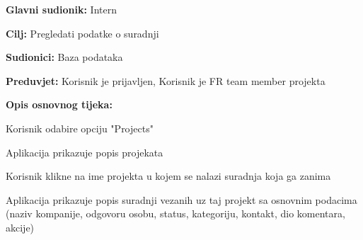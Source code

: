 					\noindent {}
					\begin{packed_item}
					
						\item \textbf{Glavni sudionik:} Intern
						\item \textbf{Cilj:} Pregledati podatke o suradnji
						\item \textbf{Sudionici:} Baza podataka
						\item \textbf{Preduvjet:} Korisnik je prijavljen, Korisnik je FR team member projekta
						\item \textbf{Opis osnovnog tijeka:}

						\item[] \begin{packed_enum}

							\item Korisnik odabire opciju "Projects"
							\item Aplikacija prikazuje popis projekata
							\item Korisnik klikne na ime projekta u kojem se nalazi suradnja koja ga zanima
							\item Aplikacija prikazuje popis suradnji vezanih uz taj projekt sa osnovnim podacima (naziv kompanije, odgovoru osobu, status, kategoriju, kontakt, dio komentara, akcije)
						\end{packed_enum}
	
					\end{packed_item}


